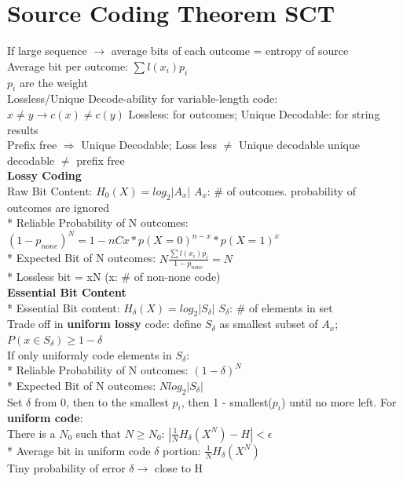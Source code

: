 \documentclass[12pt,a4paper]{extarticle}
\begin{document}
\section{Source Coding Theorem SCT}
If large sequence $\to$ average bits of each outcome = entropy of source\\
Average bit per outcome: $\sum l(x_i)p_i$\\
$p_i$ are the weight\\
Lossless/Unique Decode-ability for variable-length code:\\
$x\neq y \to c(x)\neq c(y)$ \quad Lossless: for outcomes; Unique Decodable: for string results\\
Prefix free $\Rightarrow$ Unique Decodable; Loss less $\neq$ Unique decodable \quad unique decodable $\neq$  prefix free $\quad$ \\
\newline
\textbf{Lossy Coding}\\
Raw Bit Content: $H_0(X)=log_2|A_x|$ $A_x$: $\#$ of outcomes. probability of outcomes are ignored\\
* Reliable Probability of N outcomes: $(1-p_{none})^N = 1-nCx*p(X=0)^{n-x}*p(X=1)^{x}$\\
* Expected Bit of N outcomes: $N\frac{\sum l(x_i)p_i}{1-p_{none}}=N$\\
* Lossless bit = xN (x: $\#$ of non-none code)\\
\newline
\textbf{Essential Bit Content}\\
* Essential Bit content: $H_\delta(X)=log_2|S_\delta|$ $S_
\delta $: $\#$ of elements in set\\
Trade off in \textbf{uniform lossy} code: define $S_\delta$ as smallest subset of $A_x$; $P(x\in S_\delta) \geq 1 - \delta $\\
If only uniformly code elements in $S_\delta$:\\ 
* Reliable Probability of N outcomes: $(1-
\delta)^N$\\
* Expected Bit of N outcomes: $Nlog_2|S_\delta|$\\
Set $\delta$ from 0, then to the smallest $p_i$, then 1 - smallest($p_i$) until no more left.
For \textbf{uniform code}:\\
There is a $N_0$ such that $N\geq N_0$: $|\frac{1}{N}H_\delta(X^N)-H|<\epsilon $\\
* Average bit in uniform code $\delta$ portion: $\frac{1}{N}H_\delta(X^N)$\\
Tiny probability of error $\delta \to$ close to H\\
\end{document}
